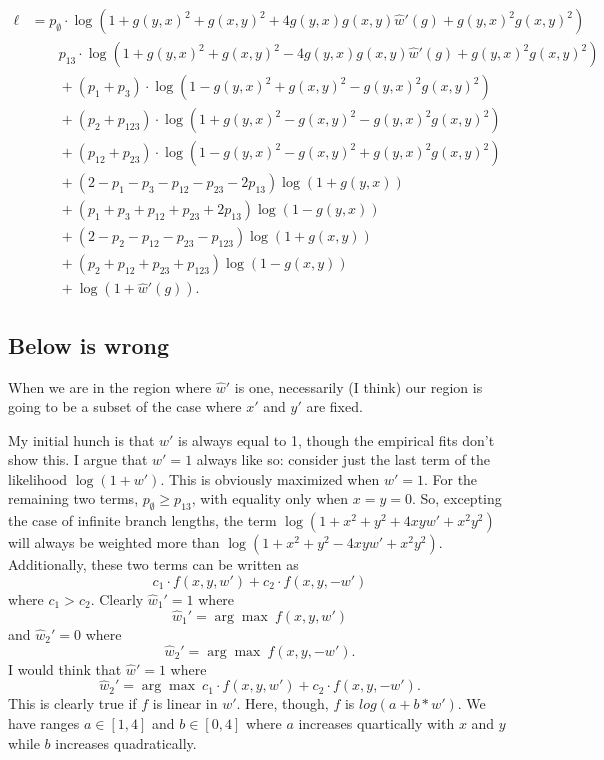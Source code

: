 \begin{align*}
    \ell
    &=        p_{\emptyset}  \cdot\log(1+g(y, x)^2+g(x, y)^2+4g(y, x)g(x, y)\hat{w}'(g)+g(y, x)^2g(x, y)^2) \\
    &\qquad   p_{13}  \cdot\log(1+g(y, x)^2+g(x, y)^2-4g(y, x)g(x, y)\hat{w}'(g)+g(y, x)^2g(x, y)^2) \\
    &\qquad + (p_{1} + p_{3})          \cdot\log(1-g(y, x)^2+g(x, y)^2-g(y, x)^2g(x, y)^2) \\
    &\qquad + (p_{2} + p_{123})          \cdot\log(1+g(y, x)^2-g(x, y)^2-g(y, x)^2g(x, y)^2) \\
    &\qquad + (p_{12} + p_{23})         \cdot\log(1-g(y, x)^2-g(x, y)^2+g(y, x)^2g(x, y)^2) \\
    &\qquad + (2-p_{1}-p_{3}-p_{12}-p_{23}-2p_{13})\log(1+g(y, x)) \\
    &\qquad + (p_{1}+p_{3}+p_{12}+p_{23}+2p_{13})\log(1-g(y, x)) \\
    &\qquad + (2-p_{2}-p_{12}-p_{23}-p_{123})\log(1+g(x, y)) \\
    &\qquad + (p_{2}+p_{12}+p_{23}+p_{123})\log(1-g(x, y)) \\
    &\qquad + \log(1+\hat{w}'(g)).
\end{align*}

\subsection{Below is wrong}

When we are in the region where $\hat{w}'$ is one, necessarily (I think) our region is going to be a subset of the case where $x'$ and $y'$ are fixed.

My initial hunch is that $w'$ is always equal to 1, though the empirical fits don't show this.
I argue that $w'=1$ always like so: consider just the last term of the likelihood $\log(1+w')$.
This is obviously maximized when $w'=1$.
For the remaining two terms, $p_{\emptyset} \ge p_{13}$, with equality only when $x=y=0$.
So, excepting the case of infinite branch lengths, the term $\log(1+x^2+y^2+4xyw'+x^2y^2)$ will always be weighted more than $\log(1+x^2+y^2-4xyw'+x^2y^2)$.
Additionally, these two terms can be written as
$$
c_1 \cdot f(x, y, w') + c_2 \cdot f(x, y, -w')
$$
where $c_1 > c_2$.
Clearly $\hat{w}_1'=1$ where
$$
\hat{w}_1' = \arg\max \ f(x, y, w')
$$
and
$\hat{w}_2'=0$ where
$$
\hat{w}_2' = \arg\max \ f(x, y, -w').
$$
I would think that $\hat{w}'=1$ where
$$
\hat{w}_2' = \arg\max \ c_1 \cdot f(x, y, w') + c_2 \cdot f(x, y, -w').
$$
This is clearly true if $f$ is linear in $w'$.
Here, though, $f$ is $log(a+b*w')$.
We have ranges $a\in[1,4]$ and $b\in[0,4]$ where $a$ increases quartically with $x$ and $y$ while $b$ increases quadratically.


